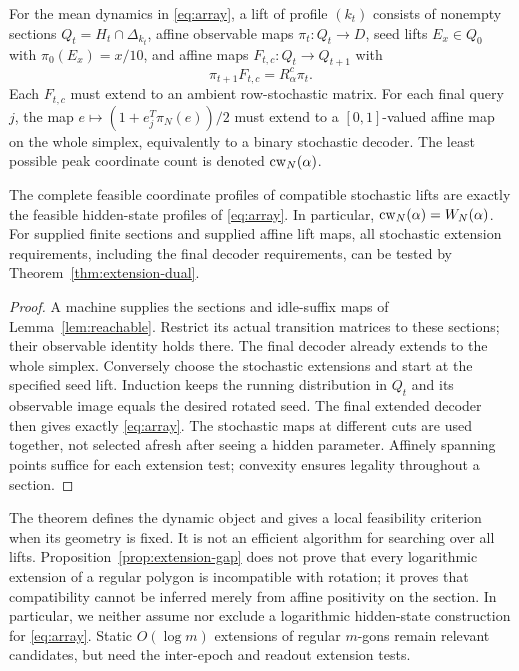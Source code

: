\begin{definition}\label{def:dynamic}
For the mean dynamics in \eqref{eq:array}, a lift of profile $(k_t)$
consists of nonempty sections $Q_t=H_t\cap\Delta_{k_t}$, affine
observable maps $\pi_t:Q_t\to D$, seed lifts $E_x\in Q_0$ with
$\pi_0(E_x)=x/10$, and affine maps $F_{t,c}:Q_t\to Q_{t+1}$ with
\[
             \pi_{t+1}F_{t,c}=R_\alpha^c\pi_t.
\]
Each $F_{t,c}$ must extend to an ambient row-stochastic matrix.
For each final query $j$, the map
$e\mapsto(1+e_j^T\pi_N(e))/2$ must extend to a $[0,1]$-valued affine
map on the whole simplex, equivalently to a binary stochastic decoder.
The least possible peak coordinate count is denoted $\operatorname{cw}_N(\alpha)$.
\end{definition}

\begin{theorem}
\label{thm:lift-equivalence}
The complete feasible coordinate profiles of compatible stochastic lifts
are exactly the feasible hidden-state profiles of \eqref{eq:array}.
In particular, $\operatorname{cw}_N(\alpha)=W_N(\alpha)$. For supplied finite
sections and supplied affine lift maps, all stochastic extension
requirements, including the final decoder requirements, can be tested
by Theorem~\ref{thm:extension-dual}.
\end{theorem}
\begin{proof}
A machine supplies the sections and idle-suffix maps of
Lemma~\ref{lem:reachable}. Restrict its actual transition matrices to
these sections; their observable identity holds there. The final decoder
already extends to the whole simplex.
Conversely choose the stochastic extensions and start at the specified
seed lift. Induction keeps the running distribution in $Q_t$ and its
observable image equals the desired rotated seed. The final extended
decoder then gives exactly \eqref{eq:array}. The stochastic maps at
different cuts are used together, not selected afresh after seeing a
hidden parameter. Affinely spanning points suffice for each extension
test; convexity ensures legality throughout a section.
\end{proof}

The theorem defines the dynamic object and gives a local feasibility
criterion when its geometry is fixed. It is not an efficient algorithm
for searching over all lifts. Proposition~\ref{prop:extension-gap} does
not prove that every logarithmic extension of a regular polygon is
incompatible with rotation; it proves that compatibility cannot be
inferred merely from affine positivity on the section. In particular,
we neither assume nor exclude a logarithmic hidden-state construction
for \eqref{eq:array}. Static $O(\log m)$ extensions of regular $m$-gons
\cite{FRT,VGG} remain relevant candidates, but need the inter-epoch and
readout extension tests.
